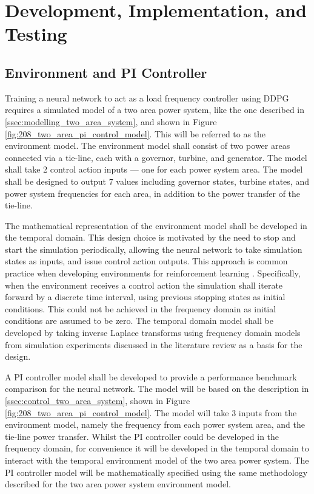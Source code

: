 \section{Development, Implementation, and Testing}
\subsection{Environment and PI Controller}\label{ssec:environment_and_pi}
Training a neural network to act as a load frequency controller using DDPG requires a simulated model of a two area power system, like the one described in \textsection \ref{ssec:modelling_two_area_system}, and shown in Figure \ref{fig:208_two_area_pi_control_model}. This will be referred to as the environment model. The environment model shall consist of two power areas connected via a tie-line, each with a governor, turbine, and generator. The model shall take 2 control action inputs --- one for each power system area. The model shall be designed to output 7 values including governor states, turbine states, and power system frequencies for each area, in addition to the power transfer of the tie-line.

The mathematical representation of the environment model shall be developed in the temporal domain. This design choice is motivated by the need to stop and start the simulation periodically, allowing the neural network to take simulation states as inputs, and issue control action outputs. This approach is common practice when developing environments for reinforcement learning \cite{Brockman2016}. Specifically, when the environment receives a control action the simulation shall iterate forward by a discrete time interval, using previous stopping states as initial conditions. This could not be achieved in the frequency domain as initial conditions are assumed to be zero. The temporal domain model shall be developed by taking inverse Laplace transforms using frequency domain models from simulation experiments discussed in the literature review as a basis for the design.

A PI controller model shall be developed to provide a performance benchmark comparison for the neural network. The model will be based on the description in \textsection \ref{ssec:control_two_area_system}, shown in Figure \ref{fig:208_two_area_pi_control_model}. The model will take 3 inputs from the environment model, namely the frequency from each power system area, and the tie-line power transfer. Whilst the PI controller could be developed in the frequency domain, for convenience it will be developed in the temporal domain to interact with the temporal environment model of the two area power system. The PI controller model will be mathematically specified using the same methodology described for the two area power system environment model.

